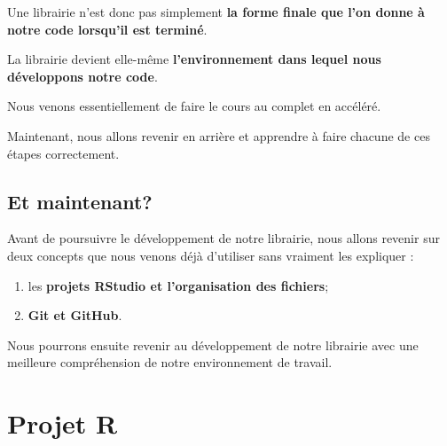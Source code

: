 \documentclass[
  letterpaper,
  DIV=11,
  numbers=noendperiod]{scrreprt}
\providecommand{\tightlist}{%
  \setlength{\itemsep}{0pt}\setlength{\parskip}{0pt}}\usepackage{longtable,booktabs,array}
\begin{document}
Une librairie n'est donc pas simplement \textbf{la forme finale que l'on
donne à notre code lorsqu'il est terminé}.

La librairie devient elle-même \textbf{l'environnement dans lequel nous
développons notre code}.

\begin{tcolorbox}[enhanced jigsaw, arc=.35mm, title=\textcolor{quarto-callout-tip-color}{\faLightbulb}\hspace{0.5em}{Pour résumer}, colback=white, left=2mm, rightrule=.15mm, toptitle=1mm, opacityback=0, bottomtitle=1mm, breakable, colframe=quarto-callout-tip-color-frame, coltitle=black, toprule=.15mm, titlerule=0mm, opacitybacktitle=0.6, bottomrule=.15mm, colbacktitle=quarto-callout-tip-color!10!white, leftrule=.75mm]

Nous venons essentiellement de faire le cours au complet en accéléré.

Maintenant, nous allons revenir en arrière et apprendre à faire chacune
de ces étapes correctement.

\end{tcolorbox}

\section*{Et maintenant?}\label{et-maintenant}


Avant de poursuivre le développement de notre librairie, nous allons
revenir sur deux concepts que nous venons déjà d'utiliser sans vraiment
les expliquer :

\begin{enumerate}
\def\labelenumi{\arabic{enumi}.}
\tightlist
\item
  les \textbf{projets RStudio et l'organisation des fichiers};
\item
  \textbf{Git et GitHub}.
\end{enumerate}

Nous pourrons ensuite revenir au développement de notre librairie avec
une meilleure compréhension de notre environnement de travail.


\chapter{Projet R}\label{projet-r}
\end{document}
